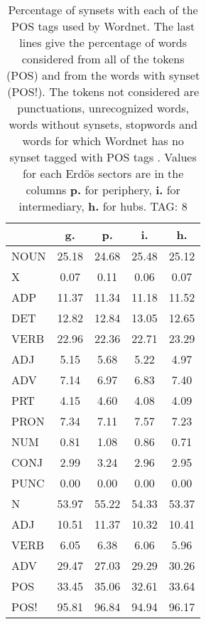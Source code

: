 \begin{table}[h!]
\begin{center}
\begin{tabular}{| l || c | c | c | c |}\hline
 & {\bf g.} & {\bf p.} & {\bf i.} & {\bf h.} \\\hline\hline
NOUN & 25.18  & 24.68  & 25.48  & 25.12 \\
X & 0.07  & 0.11  & 0.06  & 0.07 \\\hline
ADP & 11.37  & 11.34  & 11.18  & 11.52 \\
DET & 12.82  & 12.84  & 13.05  & 12.65 \\\hline
VERB & 22.96  & 22.36  & 22.71  & 23.29 \\\hline
ADJ & 5.15  & 5.68  & 5.22  & 4.97 \\
ADV & 7.14  & 6.97  & 6.83  & 7.40 \\\hline
PRT & 4.15  & 4.60  & 4.08  & 4.09 \\
PRON & 7.34  & 7.11  & 7.57  & 7.23 \\
NUM & 0.81  & 1.08  & 0.86  & 0.71 \\
CONJ & 2.99  & 3.24  & 2.96  & 2.95 \\
PUNC & 0.00  & 0.00  & 0.00  & 0.00 \\\hline\hline\hline
N & 53.97  & 55.22  & 54.33  & 53.37 \\\hline
ADJ & 10.51  & 11.37  & 10.32  & 10.41 \\\hline
VERB & 6.05  & 6.38  & 6.06  & 5.96 \\\hline
ADV & 29.47  & 27.03  & 29.29  & 30.26 \\\hline\hline
POS & 33.45  & 35.06  & 32.61  & 33.64 \\\hline
POS! & 95.81  & 96.84  & 94.94  & 96.17 \\\hline
\end{tabular}
\caption{Percentage of synsets with each of the POS tags used by Wordnet. The last lines give the percentage of words considered from all of the tokens (POS) and from the words with synset (POS!). The tokens not considered are punctuations, unrecognized words, words without synsets, stopwords and words for which Wordnet has no synset  tagged with POS tags . Values for each Erd\"os sectors are in the columns {{\bf p.}} for periphery, {{\bf i.}} for intermediary, {{\bf h.}} for hubs. TAG: 8}
\end{center}
\end{table}